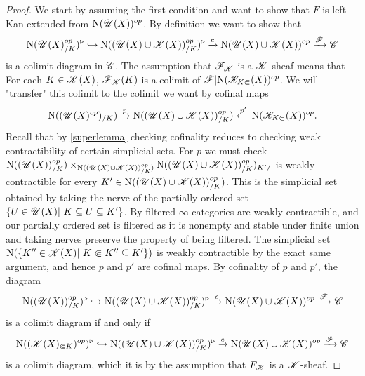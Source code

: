 \documentclass[../thesis.tex]{subfiles}
\begin{document}
\begin{proof}
    We start by assuming the first condition and want to show that $F$ is left Kan extended from $\mathrm{N}({\mathscr{U}}(X))^{op}$.
    By definition we want to show that
    \[
        \mathrm{N}(\mathscr{U}(X)_{/K}^{op})^{\triangleright} \hookrightarrow \mathrm{N}((\mathscr{U}(X)\cup \mathscr{K}(X))_{/K}^{op})^{\triangleright} \xrightarrow{c}\mathrm{N}(\mathscr{U}(X) \cup \mathscr{K}(X))^{op}\xrightarrow{\mathscr{F}}\mathscr{C}
    \]
    is a colimit diagram in $\mathscr{C}$.
    The assumption that $\mathscr{F}_{\mathscr{K}}$ is a $\mathscr{K}$-sheaf means that For each $K\in \mathscr{K}(X)$, $\mathscr{F}_{\mathscr{K}}(K)$ is a colimit of $\mathscr{F}|\mathrm{N}(\mathscr{K}_{K\Subset}(X))^{op}$.
    We will "transfer" this colimit to the colimit we want by cofinal maps
    \[
        \mathrm{N}((\mathscr{U}(X)^{op})_{/K}) \xrightarrow{p} \mathrm{N}((\mathscr{U}(X)\cup \mathscr{K}(X))_{/K}^{op}) \xleftarrow{p'}\mathrm{N}(\mathscr{K}_{K\Subset}(X))^{op}.
    \]
    Recall that by \ref{superlemma} checking cofinality reduces to checking weak contractibility of certain simplicial sets.
    For $p$ we must check $\mathrm{N}((\mathscr{U}(X))^{op}_{/K}) \times_{\mathrm{N}((\mathscr{U}(X)\cup \mathscr{K}(X))_{/K}^{op})} \mathrm{N}((\mathscr{U}(X)\cup \mathscr{K}(X))_{/K}^{op})_{K'/}$ is weakly contractible for every $K' \in \mathrm{N}((\mathscr{U}(X)\cup \mathscr{K}(X))_{/K}^{op})$.
    This is the simplicial set obtained by taking the nerve of the partially ordered set$\{U \in \Open(X) | K\subseteq U \subseteq K'\}$.
    By \cite[Lemma 5.3.1.20]{HTT} filtered $\infty$-categories are weakly contractible, and our partially ordered set is filtered as it is nonempty and stable under finite union and taking nerves preserve the property of being filtered.
    The simplicial set $\Nerve(\{K'' \in \K(X) | K \Subset K'' \subseteq K'\})$ is weakly contractible by the exact same argument, and hence $p$ and $p'$ are cofinal maps.
    By cofinality of $p$ and $p'$, the diagram
    \[
        \mathrm{N}((\mathscr{U}(X))^{op}_{/K})^{\triangleright} \hookrightarrow \mathrm{N}((\mathscr{U}(X)\cup \mathscr{K}(X))_{/K}^{op})^{\triangleright} \xrightarrow{c}\mathrm{N}(\mathscr{U}(X) \cup \mathscr{K}(X))^{op}\xrightarrow{\mathscr{F}}\mathscr{C}
    \]
    is a colimit diagram if and only if
    \[
        \mathrm{N}((\mathscr{K}(X)_{\Subset K})^{op})^{\triangleright} \hookrightarrow \mathrm{N}((\mathscr{U}(X)\cup \mathscr{K}(X))_{/K}^{op})^{\triangleright} \xrightarrow{c}\mathrm{N}(\mathscr{U}(X) \cup \mathscr{K}(X))^{op}\xrightarrow{\mathscr{F}}\mathscr{C}
    \]
    is a colimit diagram, which it is by the assumption that $F_{\mathscr{K}}$ is a $\mathscr{K}$-sheaf.

\end{proof}
\end{document}
